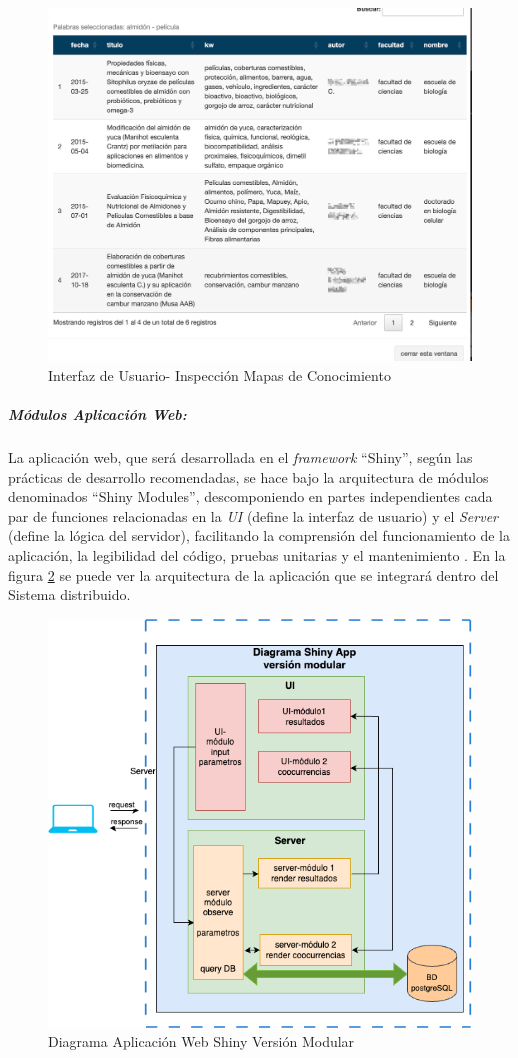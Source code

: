 \documentclass[
  12pt,
  openany]{book}
\begin{document}
\begin{enumerate}
  \begin{figure}

  {\centering \includegraphics[width=0.6\linewidth]{images/05-desarrollo/4_ciclo/UI/uiinspeccionmapas} 

  }

  \caption{Interfaz de Usuario- Inspección Mapas de Conocimiento }\label{fig:detallemc}
  \end{figure}
\end{enumerate}

\hypertarget{muxf3dulos-aplicaciuxf3n-web}{%
\subparagraph{Módulos Aplicación Web:}\label{muxf3dulos-aplicaciuxf3n-web}}

La aplicación web, que será desarrollada en el \emph{framework} ``Shiny'', según las prácticas de desarrollo recomendadas, se hace bajo la arquitectura de módulos denominados ``Shiny Modules'', descomponiendo en partes independientes cada par de funciones relacionadas en la \emph{UI} (define la interfaz de usuario) y el \emph{Server} (define la lógica del servidor), facilitando la comprensión del funcionamiento de la aplicación, la legibilidad del código, pruebas unitarias y el mantenimiento \citep{wickham2021}. En la figura \ref{fig:shinymodulo} se puede ver la arquitectura de la aplicación que se integrará dentro del Sistema distribuido.

\begin{figure}

{\centering \includegraphics[width=0.6\linewidth]{images/05-desarrollo/4_ciclo/digrama_shinyapp_modulos} 

}

\caption{Diagrama Aplicación Web Shiny Versión Modular}\label{fig:shinymodulo}
\end{figure}
\end{document}
